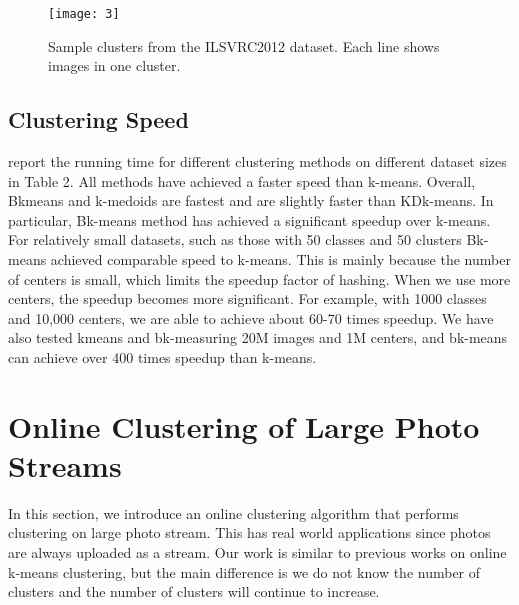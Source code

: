 \documentclass[10pt,twocolumn,letterpaper]{article}
\begin{document}
\begin{figure}
\centering
\texttt{[image: 3]}
\caption{Sample clusters from the ILSVRC2012 dataset. Each line shows images in one cluster.}
\label{fig:2}
\end{figure}


\subsection{Clustering Speed}
report the running time for different clustering methods
on different dataset sizes in Table 2. All methods
have achieved a faster speed than k-means. Overall, Bkmeans
and k-medoids are fastest and are slightly faster than
KDk-means. In particular, Bk-means method has achieved
a significant speedup over k-means. For relatively small
datasets, such as those with 50 classes and 50 clusters
Bk-means achieved comparable speed to k-means. This
is mainly because the number of centers is small, which
limits the speedup factor of hashing. When we use more
centers, the speedup becomes more significant. For example,
with 1000 classes and 10,000 centers, we are able to
achieve about 60-70 times speedup. We have also tested kmeans
and bk-measuring 20M images and 1M centers, and
bk-means can achieve over 400 times speedup than k-means.
\section{Online Clustering of Large Photo Streams}
In this section, we introduce an online clustering algorithm
that performs clustering on large photo stream. This
has real world applications since photos are always uploaded
as a stream. Our work is similar to previous works
on online k-means clustering, but the main difference is we
do not know the number of clusters and the number of clusters
will continue to increase.
\end{document}
